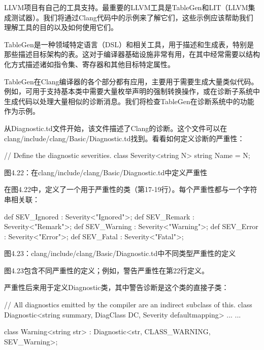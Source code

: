 LLVM项目有自己的工具支持。最重要的LLVM工具是TableGen和LIT（LLVM集成测试器）。我们将通过Clang代码中的示例来了解它们，这些示例应该帮助我们理解工具的目的以及如何使用它们。


TableGen是一种领域特定语言（DSL）和相关工具，用于描述和生成表，特别是那些描述目标架构的表。这对于编译器基础设施非常有用，在其中经常需要以结构化方式描述诸如指令集、寄存器和其他目标特定属性。

TableGen在Clang编译器的各个部分都有应用，主要用于需要生成大量类似代码。例如，可用于支持基本类中需要大量枚举声明的强制转换操作，或在诊断子系统中生成代码以处理大量相似的诊断消息。我们将检查TableGen在诊断系统中的功能作为示例。

从Diagnostic.td文件开始，该文件描述了Clang的诊断。这个文件可以在clang/include/clang/Basic/Diagnostic.td找到。看看如何定义诊断的严重性：

\begin{shell}
// Define the diagnostic severities.
class Severity<string N> {
  string Name = N;
}
\end{shell}

\begin{center}
图4.22：在clang/include/clang/Basic/Diagnostic.td中定义严重性
\end{center}

在图4.22中，定义了一个用于严重性的类（第17-19行）。每个严重性都与一个字符串相关联：

\begin{shell}
def SEV_Ignored : Severity<"Ignored">;
def SEV_Remark  : Severity<"Remark">;
def SEV_Warning : Severity<"Warning">;
def SEV_Error   : Severity<"Error">;
def SEV_Fatal   : Severity<"Fatal">;
\end{shell}

\begin{center}
图4.23：clang/include/clang/Basic/Diagnostic.td中不同类型严重性的定义
\end{center}

图4.23包含不同严重性的定义；例如，警告严重性在第22行定义。

严重性后来用于定义Diagnostic类，其中警告诊断是这个类的直接子类：

\begin{shell}
// All diagnostics emitted by the compiler are an indirect subclass of this.
class Diagnostic<string summary, DiagClass DC, Severity defaultmapping> {
    ...
}
...

class Warning<string str>   : Diagnostic<str, CLASS_WARNING, SEV_Warning>;
\end{shell}

